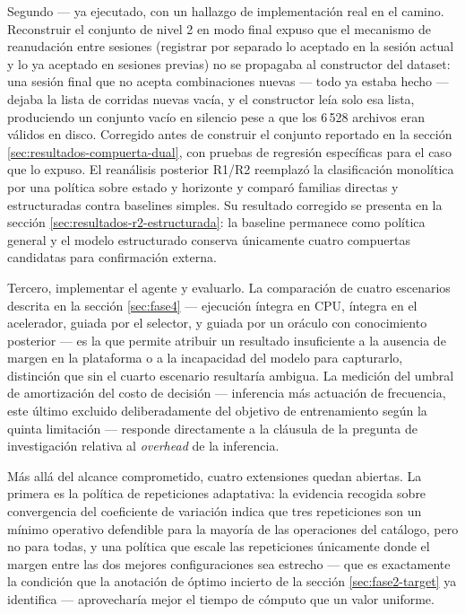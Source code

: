 \documentclass[12pt,oneside,spanish]{book}
\begin{document}
Segundo --- ya ejecutado, con un hallazgo de implementación real en el camino. Reconstruir el conjunto de nivel 2 en modo final expuso que el mecanismo de reanudación entre sesiones (registrar por separado lo aceptado en la sesión actual y lo ya aceptado en sesiones previas) no se propagaba al constructor del dataset: una sesión final que no acepta combinaciones nuevas --- todo ya estaba hecho --- dejaba la lista de corridas nuevas vacía, y el constructor leía solo esa lista, produciendo un conjunto vacío en silencio pese a que los 6\,528 archivos eran válidos en disco. Corregido antes de construir el conjunto reportado en la sección \ref{sec:resultados-compuerta-dual}, con pruebas de regresión específicas para el caso que lo expuso. El reanálisis posterior R1/R2 reemplazó la clasificación monolítica por una política sobre estado y horizonte y comparó familias directas y estructuradas contra baselines simples. Su resultado corregido se presenta en la sección \ref{sec:resultados-r2-estructurada}: la baseline permanece como política general y el modelo estructurado conserva únicamente cuatro compuertas candidatas para confirmación externa.

Tercero, implementar el agente y evaluarlo. La comparación de cuatro escenarios descrita en la sección \ref{sec:fase4} --- ejecución íntegra en CPU, íntegra en el acelerador, guiada por el selector, y guiada por un oráculo con conocimiento posterior --- es la que permite atribuir un resultado insuficiente a la ausencia de margen en la plataforma o a la incapacidad del modelo para capturarlo, distinción que sin el cuarto escenario resultaría ambigua. La medición del umbral de amortización del costo de decisión --- inferencia más actuación de frecuencia, este último excluido deliberadamente del objetivo de entrenamiento según la quinta limitación --- responde directamente a la cláusula de la pregunta de investigación relativa al \textit{overhead} de la inferencia.

Más allá del alcance comprometido, cuatro extensiones quedan abiertas. La primera es la política de repeticiones adaptativa: la evidencia recogida sobre convergencia del coeficiente de variación indica que tres repeticiones son un mínimo operativo defendible para la mayoría de las operaciones del catálogo, pero no para todas, y una política que escale las repeticiones únicamente donde el margen entre las dos mejores configuraciones sea estrecho --- que es exactamente la condición que la anotación de óptimo incierto de la sección \ref{sec:fase2-target} ya identifica --- aprovecharía mejor el tiempo de cómputo que un valor uniforme.
\end{document}
